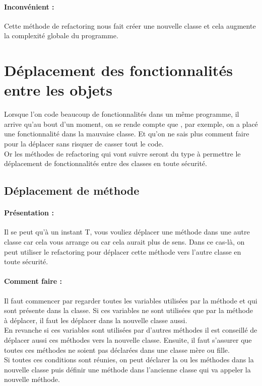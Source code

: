 \documentclass[a4paper,twoside,12pt,openright]{report}
\begin{document}
\paragraph{Inconvénient :}
Cette méthode de refactoring nous fait créer une nouvelle classe et cela augmente la complexité globale du programme.\\

\newpage

\section{Déplacement des fonctionnalités entre les objets}
Lorsque l'on code beaucoup de fonctionnalités dans un même programme, il arrive qu'au bout d'un moment, on se rende compte que , par exemple, on a placé une fonctionnalité dans la mauvaise classe. Et qu'on ne sais plus comment faire pour la déplacer sans risquer de casser tout le code.\\
Or les méthodes de refactoring qui vont suivre seront du type à permettre le déplacement de fonctionnalités entre des classes en toute sécurité.\\


\subsection{Déplacement de méthode}
\paragraph{Présentation :}
Il se peut qu'à un instant T, vous vouliez déplacer une méthode dans une autre classe car cela vous arrange ou car cela aurait plus de sens. Dans ce cas-là, on peut utiliser le refactoring pour déplacer cette méthode vers l'autre classe en toute sécurité.

\paragraph{Comment faire :}
Il faut commencer par regarder toutes les variables utilisées par la méthode et qui sont présente dans la classe. Si ces variables ne sont utilisées que par la méthode à déplacer, il faut les déplacer dans la nouvelle classe aussi.\\
En revanche si ces variables sont utilisées par d'autres méthodes il est conseillé de déplacer aussi ces méthodes vers la nouvelle classe.
Ensuite, il faut s'assurer que toutes ces méthodes ne soient pas déclarées dans une classe mère ou fille.\\
Si toutes ces conditions sont réunies, on peut déclarer la ou les méthodes dans la nouvelle classe puis définir une méthode dans l'ancienne classe qui va appeler la nouvelle méthode.
\end{document}
